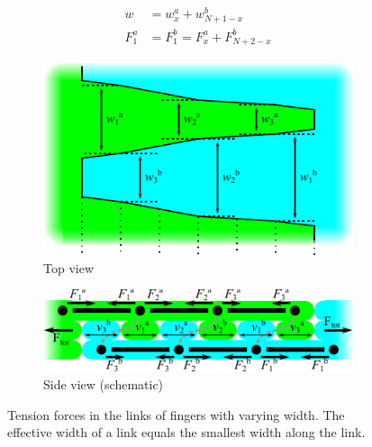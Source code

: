 \begin{align}
	w &= w_x^a + w_{N+1-x}^b \label{eq:width_formula} \\
	F_1^a &= F_1^b = F_x^a + F_{N+2-x}^b  \label{eq:forces_formula}
\end{align}

\begin{figure}
	\centering
	\begin{subfigure}{\columnwidth}
		\includegraphics[width=\columnwidth]{../sources/method/varying_width_fingers.pdf}
		\caption{Top view}
	\end{subfigure}
	\begin{subfigure}{\columnwidth}
		\includegraphics[width=\columnwidth]{../sources/method/stress_distribution.pdf}
		\caption{Side view (schematic)}
	\end{subfigure}
	\caption{Tension forces in the links of fingers with varying width. The effective width of a link equals the smallest width along the link.}
	\label{fig:force_distribution}
\end{figure}


